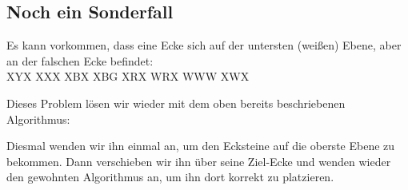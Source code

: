 \subsection{Noch ein Sonderfall}
Es kann vorkommen, dass eine Ecke sich auf der untersten (weißen) Ebene, aber an der falschen Ecke befindet:\\[1em]
\RubikCubeGreyAll%
            {X}{Y}{X}
            {X}{X}{X}%
               {X}{B}{X}
	       {X}{B}{G}%
	       {X}{R}{X}
	       {W}{R}{X}%
	      {W}{W}{W}
	      {X}{W}{X}%

Dieses Problem lösen wir wieder mit dem oben bereits beschriebenen Algorithmus:
\begin{center}
\end{center}
Diesmal wenden wir ihn einmal an, um den Ecksteine auf die oberste Ebene zu bekommen.
Dann verschieben wir ihn über seine Ziel-Ecke und wenden wieder den gewohnten Algorithmus an, um ihn dort korrekt zu platzieren.
